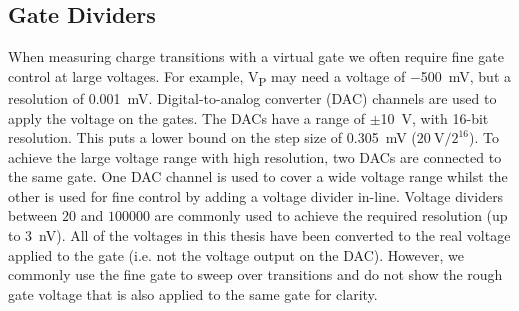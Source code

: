 \subsection{Gate Dividers}
When measuring charge transitions with a virtual gate we often require fine gate control at large voltages. For example, V\textsubscript{P} may need a voltage of $-$\qty{500}{mV}, but a resolution of \qty{0.001}{mV}. Digital-to-analog converter (DAC) channels are used to apply the voltage on the gates. The DACs have a range of $\pm$\qty{10}{V}, with 16-bit resolution. This puts a lower bound on the step size of \qty{0.305}{mV} ($\mathrm{\qty{20}{V}/2^{16}}$). To achieve the large voltage range with high resolution, two DACs are connected to the same gate. One DAC channel is used to cover a wide voltage range whilst the other is used for fine control by adding a voltage divider in-line. Voltage dividers between $20$ and $100000$ are commonly used to achieve the required resolution (up to \qty{3}{nV}). All of the voltages in this thesis have been converted to the real voltage applied to the gate (i.e. not the voltage output on the DAC). However, we commonly use the fine gate to sweep over transitions and do not show the rough gate voltage that is also applied to the same gate for clarity. 













